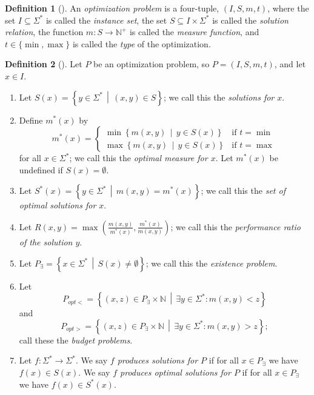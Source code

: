 \documentclass[]{article}
\theoremstyle{plain}
\theoremstyle{definition}
\newtheorem{definition}{Definition}
\newcommand{\lb}{\left\{}
\newcommand{\rb}{\right\}}
\newcommand{\st}{\,\middle|\,}
\begin{document}
\begin{definition}[\cite{acgkmp99}]
  An \emph{optimization problem} is a four-tuple, $(I, S, m, t)$, where the set $I \subseteq \Sigma^*$ is called the \emph{instance set}, the set $S \subseteq I \times \Sigma^*$ is called the \emph{solution relation}, the function $m \colon S \to \mathbb{N}^+$ is called the \emph{measure function}, and $t \in \{\min, \max\}$ is called the \emph{type} of the optimization.
\end{definition}

\begin{definition}[\cite{tantau07}]
  Let $P$ be an optimization problem, so $P = (I, S, m, t)$, and let $x\in I$.
  \begin{enumerate}
  \item Let $S(x)=\lb y\in\Sigma^* \st (x, y)\in S \rb$; we call this the \emph{solutions for $x$}.
  \item Define $m^*(x)$ by
    \begin{displaymath}
      m^*(x) =
      \begin{cases}
        \min \lb m(x, y) \st y\in S(x) \rb & \text{if } t = \min \\
        \max \lb m(x, y) \st y\in S(x) \rb & \text{if } t = \max
      \end{cases}
    \end{displaymath}
    for all $x\in \Sigma^*$; we call this the \emph{optimal measure for $x$}.
    Let $m^*(x)$ be undefined if $S(x)=\emptyset$.
  \item Let $S^*(x)=\lb y\in\Sigma^* \st m(x, y) = m^*(x) \rb$; we call this the \emph{set of optimal solutions for $x$}.
  \item Let $R(x, y)=\max\left( \frac{m(x, y)}{m^*(x)}, \frac{m^*(x)}{m(x, y)} \right)$; we call this the \emph{performance ratio of the solution $y$}.
  \item Let $P_\exists = \lb x\in \Sigma^* \st S(x) \neq \emptyset \rb$; we call this the \emph{existence problem}.
  \item Let
    \begin{displaymath}
      P_{opt<}=\lb (x, z) \in P_\exists\times\mathbb{N} \st \exists y\in\Sigma^*\colon m(x, y) < z \rb
    \end{displaymath}
    and
    \begin{displaymath}
      P_{opt>}=\lb (x, z) \in P_\exists\times\mathbb{N} \st \exists y\in\Sigma^*\colon m(x, y) > z \rb;
    \end{displaymath}
    call these the \emph{budget problems}.
  \item Let $f\colon \Sigma^*\to\Sigma^*$.
    We say \emph{$f$ produces solutions for $P$} if for all $x\in P_\exists$ we have $f(x)\in S(x)$.
    We say \emph{$f$ produces optimal solutions for $P$} if for all $x\in P_\exists$ we have $f(x)\in S^*(x)$.
  \end{enumerate}
\end{definition}
\end{document}
